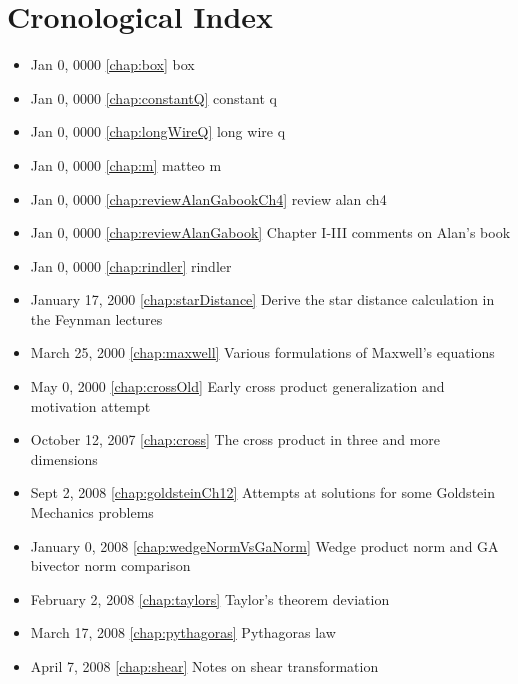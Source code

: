 \chapter{Cronological Index}
\begin{itemize}

\item Jan 0, 0000 \ref{chap:box} box

\item Jan 0, 0000 \ref{chap:constantQ} constant q

\item Jan 0, 0000 \ref{chap:longWireQ} long wire q

\item Jan 0, 0000 \ref{chap:m} matteo m

\item Jan 0, 0000 \ref{chap:reviewAlanGabookCh4} review alan ch4

\item Jan 0, 0000 \ref{chap:reviewAlanGabook} Chapter I-III comments on Alan's book

\item Jan 0, 0000 \ref{chap:rindler} rindler

\item January 17, 2000 \ref{chap:starDistance} Derive the star distance calculation in the Feynman lectures

\item March 25, 2000 \ref{chap:maxwell} Various formulations of Maxwell's equations

\item May 0, 2000 \ref{chap:crossOld} Early cross product generalization and motivation attempt

\item October 12, 2007 \ref{chap:cross} The cross product in three and more dimensions

\item Sept 2, 2008 \ref{chap:goldsteinCh12} Attempts at solutions for some Goldstein Mechanics problems

\item January 0, 2008 \ref{chap:wedgeNormVsGaNorm} Wedge product norm and GA bivector norm comparison

\item February 2, 2008 \ref{chap:taylors} Taylor's theorem deviation

\item March 17, 2008 \ref{chap:pythagoras} Pythagoras law

\item April 7, 2008 \ref{chap:shear} Notes on shear transformation


\end{itemize}
